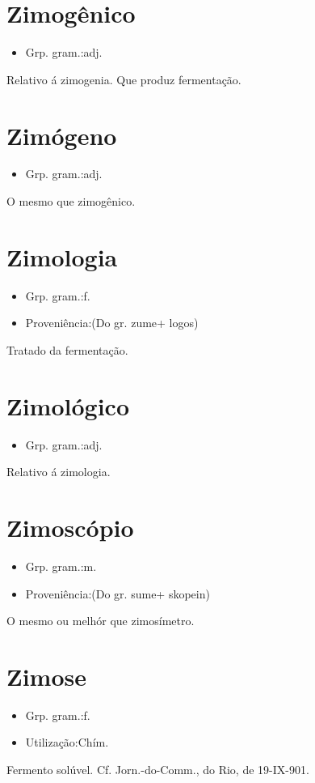 \section{Zimogênico}
\begin{itemize}
\item {Grp. gram.:adj.}
\end{itemize}
Relativo á zimogenia.
Que produz fermentação.
\section{Zimógeno}
\begin{itemize}
\item {Grp. gram.:adj.}
\end{itemize}
O mesmo que \textunderscore zimogênico\textunderscore .
\section{Zimologia}
\begin{itemize}
\item {Grp. gram.:f.}
\end{itemize}
\begin{itemize}
\item {Proveniência:(Do gr. \textunderscore zume\textunderscore  + \textunderscore logos\textunderscore )}
\end{itemize}
Tratado da fermentação.
\section{Zimológico}
\begin{itemize}
\item {Grp. gram.:adj.}
\end{itemize}
Relativo á zimologia.
\section{Zimoscópio}
\begin{itemize}
\item {Grp. gram.:m.}
\end{itemize}
\begin{itemize}
\item {Proveniência:(Do gr. \textunderscore sume\textunderscore  + \textunderscore skopein\textunderscore )}
\end{itemize}
O mesmo ou melhór que \textunderscore zimosímetro.\textunderscore 
\section{Zimose}
\begin{itemize}
\item {Grp. gram.:f.}
\end{itemize}
\begin{itemize}
\item {Utilização:Chím.}
\end{itemize}
Fermento solúvel. Cf. \textunderscore Jorn.-do-Comm.\textunderscore , do Rio, de 19-IX-901.
